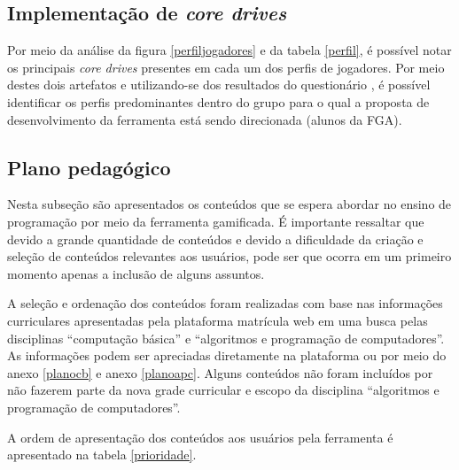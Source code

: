 \subsection{Implementação de \textit{core drives}}


Por meio da análise da figura \ref{perfiljogadores} e da tabela \ref{perfil}, é possível notar os principais \textit{core drives} 
presentes em cada um dos perfis de jogadores. Por meio destes dois artefatos e utilizando-se dos resultados do questionário , é possível 
identificar os perfis predominantes dentro do grupo para o qual a proposta de desenvolvimento da ferramenta está sendo direcionada 
(alunos da FGA).


\subsection{Plano pedagógico}

Nesta subseção são apresentados os conteúdos que se espera abordar no ensino de programação por meio da ferramenta gamificada. É importante  
ressaltar que devido a grande quantidade de conteúdos e devido a dificuldade da criação e seleção de conteúdos relevantes aos usuários, pode 
ser que ocorra em um primeiro momento apenas a inclusão de alguns assuntos. 

A seleção e ordenação dos conteúdos foram realizadas com base nas informações curriculares apresentadas pela plataforma matrícula web em uma 
busca pelas disciplinas “computação básica” e “algoritmos e programação de computadores”. As informações podem ser apreciadas diretamente na 
plataforma ou por meio do anexo \ref{planocb} e anexo \ref{planoapc}. Alguns conteúdos não foram incluídos por não fazerem parte da nova grade curricular e escopo da 
disciplina “algoritmos e programação de computadores”.

A ordem de apresentação dos conteúdos aos usuários pela ferramenta é apresentado na tabela \ref{prioridade}.

